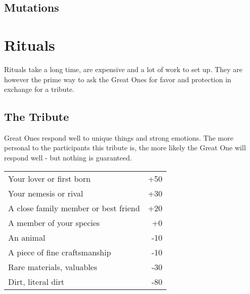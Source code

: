 \documentclass[12pt,a4paper,openany]{book}
\begin{document}
	\section*{Mutations}
	\vspace{4mm}
	\begin{multicols}{2}
	\end{multicols}
	
	\chapter{Rituals}
	Rituals take a long time, are expensive and a lot of work to set up. They are however the prime way to ask the Great Ones for favor and protection in exchange for a tribute.
	\section{The Tribute}
	Great Ones respond well to unique things and strong emotions. The more personal to the participants this tribute is, the more likely the Great One will respond well - but nothing is guaranteed.
	\par
	\begin{center}
	\begin{tabular}{lr}
		Your lover or first born & +50 \\
		Your nemesis or rival & +30 \\
		A close family member or best friend & +20 \\
		A member of your species & +0 \\
		An animal & -10 \\
		\hline
		A piece of fine craftsmanship & -10 \\
		Rare materials, valuables & -30 \\
		Dirt, literal dirt & -80
	\end{tabular}
	\end{center}
\end{document}
